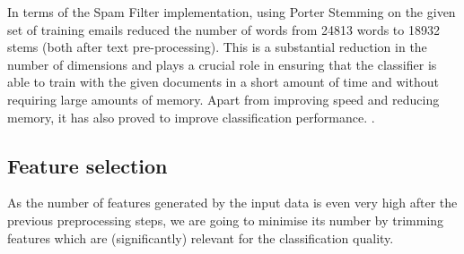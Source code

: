 In terms of the Spam Filter implementation, using Porter Stemming on the given set of training emails reduced the number of words from 24813 words to 18932 stems (both after text pre-processing). This is a substantial reduction in the number of dimensions and plays a crucial role in ensuring that the classifier is able to train with the given documents in a short amount of time and without requiring large amounts of memory. Apart from improving speed and reducing memory, it has also proved to improve classification performance. .


\subsection{Feature selection}

As the number of features generated by the input data is even very high after the previous preprocessing steps, we are going to minimise its number by trimming features which are (significantly) relevant for the classification quality.

\todo{\dots}


